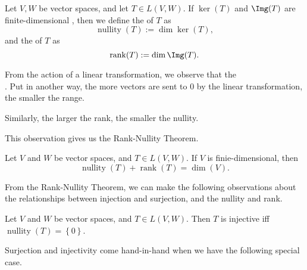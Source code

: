 \documentclass[notoc,notitlepage]{tufte-book}
\DeclareMathOperator{\nullity}{nullity}
\DeclareMathOperator{\rank}{rank}
\begin{document}
\begin{defn}\label{defn:rank_and_nullity}
  Let $V, W$ be vector spaces, and let $T \in L(V, W)$.
  If $\ker(T)$ and $\Img(T)$ are finite-dimensional
  ,
  then we define the  of $T$ as
  \begin{equation*}
    \nullity(T) := \dim \ker (T),
  \end{equation*}
  and the  of $T$ as
  \begin{equation*}
    \rank(T) := \dim \Img(T).
  \end{equation*}
\end{defn}

\begin{note}
  From the action of a linear transformation, we observe that the \\
  \noindent
  .
  Put in another way, the more vectors are sent to $0$ by the linear transformation,
  the smaller the range.

  Similarly, the larger the rank, the smaller the nullity.
\end{note}

This observation gives us the Rank-Nullity Theorem.

\begin{thm}\label{thm:rank_nullity_theorem}
  Let $V$ and $W$ be vector spaces, and $T \in L(V, W)$. If $V$ is finie-dimensional, then
  \begin{equation*}
    \nullity(T) + \rank(T) = \dim (V).
  \end{equation*}
\end{thm}

From the Rank-Nullity Theorem,
we can make the following observations about the relationships
between injection and surjection, and the nullity and rank.

\begin{propo}\label{propo:nullity_of_only_0_and_injectivity}
  Let $V$ and $W$ be vector spaces, and $T \in L(V, W)$.
  Then $T$ is injective iff $\nullity(T) = \left\{ 0 \right\}$.
\end{propo}

Surjection and injectivity come hand-in-hand when
we have the following special case.
\end{document}
